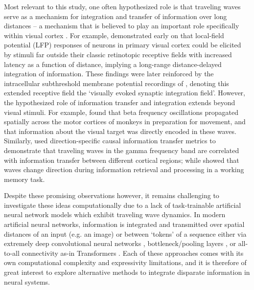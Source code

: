 Most relevant to this study, one often hypothesized role is that traveling waves serve as a mechanism for integration and transfer of information over long distances -- a mechanism that is believed to play an important role specifically within visual cortex \citep{Sato2012}. For example, \cite{Kitano_Niiyama_Kasamatsu_Sutter_Norcia_1994} demonstrated early on that local-field potential (LFP) responses of neurons in primary visual cortex could be elicited by stimuli far outside their classic retinotopic receptive fields with increased latency as a function of distance, implying a long-range distance-delayed integration of information. These findings were later reinforced by the intracellular subthreshold membrane potential recordings of \cite{yves1999}, denoting this extended receptive field the `visually evoked synaptic integration field'. However, the hypothesized role of information transfer and integration extends beyond visual stimuli. For example, \cite{motor_waves} found that beta frequency oscillations propagated spatially across the motor cortices of monkeys in preparation for movement, and that information about the visual target was directly encoded in these waves. Similarly, \cite{info_transfer} used direction-specific causal information transfer metrics to demonstrate that traveling waves in the gamma frequency band are correlated with information transfer between different cortical regions; while \cite{direction_waves} showed that waves change direction during information retrieval and processing in a working memory task.

Despite these promising observations however, it remains challenging to investigate these ideas computationally due to a lack of task-trainable artificial neural network models which exhibit traveling wave dynamics. In modern artificial neural networks, information is integrated and transmitted over spatial distances of an input (e.g. an image) or between `tokens' of a sequence either via extremely deep convolutional neural networks \citep{resnet}, bottleneck/pooling layers \citep{ronneberger_u-net_2015}, or all-to-all connectivity as-in Transformers \citep{vaswani2023attentionneed}. Each of these approaches comes with its own computational complexity and expressivity limitations, and it is therefore of great interest to explore alternative methods to integrate disparate information in neural systems.

